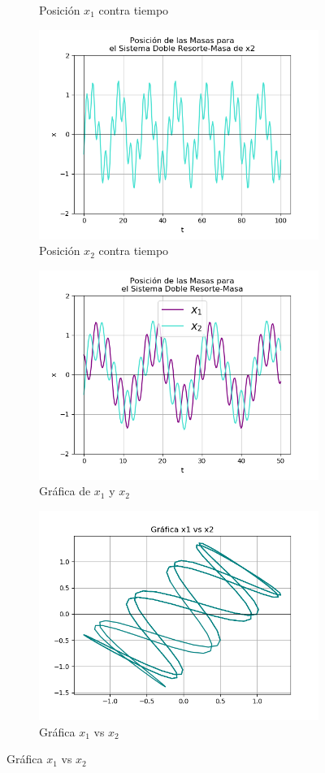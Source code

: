 \documentclass[12pt]{article}
\begin{document}
\begin{figure}[h!]
\begin{subfigure}{.55\textwidth}
  \caption{Posición $x_1$ contra tiempo}
  \label{fig:sfig2}
\end{subfigure}
\begin{subfigure}{.55\textwidth}
  \centering
  \includegraphics[width=.8\linewidth]{Ej2_34.png}
  \caption{Posición $x_2$ contra tiempo}
  \label{fig:sfig2}
\end{subfigure}
\begin{subfigure}{.55\textwidth}
  \centering
  \includegraphics[width=.8\linewidth]{Ej2_35.png}
  \caption{Gráfica de $x_1$ y $x_2$}
  \label{fig:sfig2}
\end{subfigure}
\begin{subfigure}{.55\textwidth}
  \centering
  \includegraphics[width=.8\linewidth]{Ej2_36.png}
  \caption{Gráfica $x_1$ vs $x_2$}
  \label{fig:sfig2}
\end{subfigure}
\end{figure}
\end{document}
